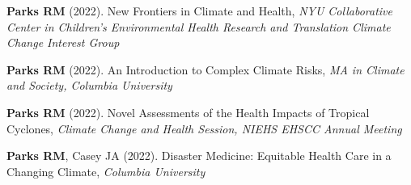 \noindent \textbf{Parks RM} (2022). New Frontiers in Climate and Health, \textit{NYU Collaborative Center in Children's Environmental Health Research and Translation Climate Change Interest Group
} \medskip

\noindent \textbf{Parks RM} (2022). An Introduction to Complex Climate Risks, \textit{MA in Climate and Society, Columbia University} \medskip

\noindent \textbf{Parks RM} (2022). Novel Assessments of the Health Impacts of Tropical Cyclones, \textit{Climate Change and Health Session, NIEHS EHSCC Annual Meeting} \medskip

\noindent \textbf{Parks RM}, Casey JA (2022). Disaster Medicine: Equitable Health Care in a Changing Climate, \textit{Columbia University} \medskip








